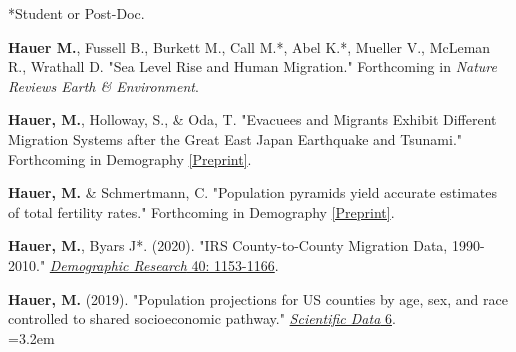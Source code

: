  *Student or Post-Doc.
 
 \begin{etaremune}

    \item \textbf{Hauer M.}, Fussell B., Burkett M., Call M.*, Abel K.*, Mueller V., McLeman R., Wrathall D.  "Sea Level Rise and Human Migration." Forthcoming in \textit{Nature Reviews Earth \& Environment}.
 
     \item \textbf{Hauer, M.}, Holloway, S., \& Oda, T. "Evacuees and Migrants Exhibit Different Migration Systems after the Great East Japan Earthquake and Tsunami." Forthcoming in Demography \href{https://osf.io/preprints/socarxiv/76y5z/}{[Preprint]}.\\
 
     \item \textbf{Hauer, M.} \& Schmertmann, C. "Population pyramids yield accurate estimates of total fertility rates." Forthcoming in Demography \href{https://osf.io/preprints/socarxiv/2f3v6/}{[Preprint]}.\\
 
    \item \textbf{Hauer, M.}, Byars J*. (2020). "IRS County-to-County Migration Data, 1990-2010." \href{https://www.demographic-research.org/volumes/vol40/40/default.htm}{\textit{Demographic Research} 40: 1153-1166}.


  \item \textbf{Hauer, M.} (2019). "Population projections for US counties by age, sex, and race controlled to shared socioeconomic pathway." \href{https://www.nature.com/articles/sdata20195}{\textit{Scientific Data} 6}.\\
  \hangindent=3.2em
\end{etaremune}
